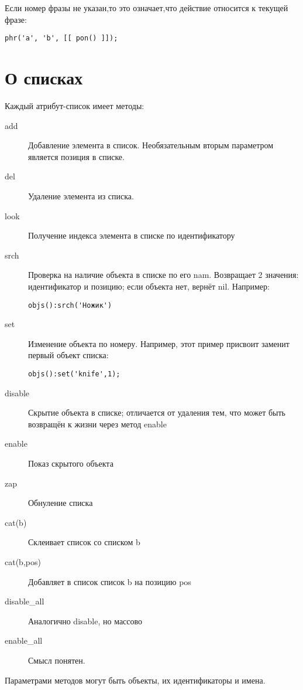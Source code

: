 \documentclass[a4paper,12pt]{article}
\begin{document}
Если номер фразы не указан,то это означает,что действие относится к текущей фразе:

\begin{verbatim}
phr('a', 'b', [[ pon() ]]);
\end{verbatim}

\section{О списках}

Каждый атрибут-список имеет методы:

\begin{description}
\item[add] Добавление элемента в список. Необязательным вторым параметром является позиция в списке.
\item[del] Удаление элемента из списка.
\item[look] Получение индекса элемента в списке по идентификатору
\item[srch] Проверка на наличие объекта в списке по его nam. Возвращает 2 значения: идентификатор и позицию; если объекта нет, вернёт nil. Например: \begin{verbatim}objs():srch('Ножик')\end{verbatim}
\item[set] Изменение объекта по номеру. Например, этот пример присвоит заменит первый объект списка: \begin{verbatim}objs():set('knife',1);\end{verbatim}
\item[disable] Скрытие объекта в списке; отличается от удаления тем, что может быть возвращён к жизни через метод enable
\item[enable] Показ скрытого объекта
\item[zap] Обнуление списка
\item[cat(b)] Склеивает список со списком b
\item[cat(b,pos)] Добавляет в список список b на позицию pos
\item[disable\_all] Аналогично disable, но массово
\item[enable\_all] Смысл понятен.
\end{description}

Параметрами методов могут быть объекты, их идентификаторы и имена.
\end{document}
